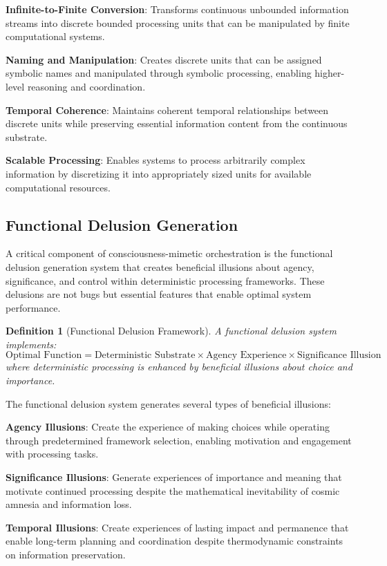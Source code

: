 \documentclass[12pt,a4paper]{article}
\newtheorem{definition}[theorem]{Definition}
\begin{document}
\textbf{Infinite-to-Finite Conversion}: Transforms continuous unbounded information streams into discrete bounded processing units that can be manipulated by finite computational systems.

\textbf{Naming and Manipulation}: Creates discrete units that can be assigned symbolic names and manipulated through symbolic processing, enabling higher-level reasoning and coordination.

\textbf{Temporal Coherence}: Maintains coherent temporal relationships between discrete units while preserving essential information content from the continuous substrate.

\textbf{Scalable Processing}: Enables systems to process arbitrarily complex information by discretizing it into appropriately sized units for available computational resources.

\subsection{Functional Delusion Generation}

A critical component of consciousness-mimetic orchestration is the functional delusion generation system that creates beneficial illusions about agency, significance, and control within deterministic processing frameworks. These delusions are not bugs but essential features that enable optimal system performance.

\begin{definition}[Functional Delusion Framework]
A functional delusion system implements:
$$\text{Optimal Function} = \text{Deterministic Substrate} \times \text{Agency Experience} \times \text{Significance Illusion}$$
where deterministic processing is enhanced by beneficial illusions about choice and importance.
\end{definition}

The functional delusion system generates several types of beneficial illusions:

\textbf{Agency Illusions}: Create the experience of making choices while operating through predetermined framework selection, enabling motivation and engagement with processing tasks.

\textbf{Significance Illusions}: Generate experiences of importance and meaning that motivate continued processing despite the mathematical inevitability of cosmic amnesia and information loss.

\textbf{Temporal Illusions}: Create experiences of lasting impact and permanence that enable long-term planning and coordination despite thermodynamic constraints on information preservation.
\end{document}
